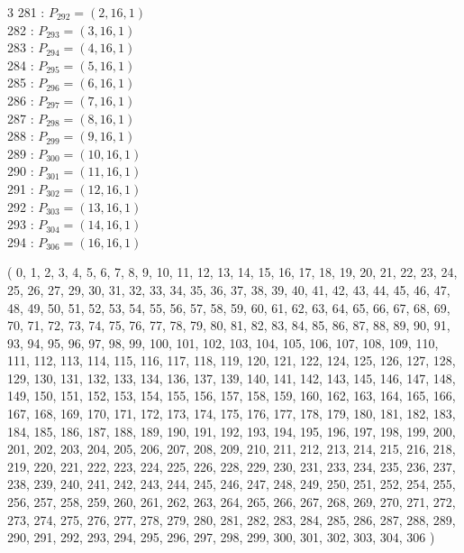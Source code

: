 \documentclass{article}
\begin{document}
{\begin{multicols}{3}
281 : $P_{292}=( 2, 16, 1 )$\\
282 : $P_{293}=( 3, 16, 1 )$\\
283 : $P_{294}=( 4, 16, 1 )$\\
284 : $P_{295}=( 5, 16, 1 )$\\
285 : $P_{296}=( 6, 16, 1 )$\\
286 : $P_{297}=( 7, 16, 1 )$\\
287 : $P_{298}=( 8, 16, 1 )$\\
288 : $P_{299}=( 9, 16, 1 )$\\
289 : $P_{300}=( 10, 16, 1 )$\\
290 : $P_{301}=( 11, 16, 1 )$\\
291 : $P_{302}=( 12, 16, 1 )$\\
292 : $P_{303}=( 13, 16, 1 )$\\
293 : $P_{304}=( 14, 16, 1 )$\\
294 : $P_{306}=( 16, 16, 1 )$\\
\end{multicols}
( 0, 1, 2, 3, 4, 5, 6, 7, 8, 9, 10, 11, 12, 13, 14, 15, 16, 17, 18, 19, 20, 21, 22, 23, 24, 25, 26, 27, 29, 30, 31, 32, 33, 34, 35, 36, 37, 38, 39, 40, 41, 42, 43, 44, 45, 46, 47, 48, 49, 50, 51, 52, 53, 54, 55, 56, 57, 58, 59, 60, 61, 62, 63, 64, 65, 66, 67, 68, 69, 70, 71, 72, 73, 74, 75, 76, 77, 78, 79, 80, 81, 82, 83, 84, 85, 86, 87, 88, 89, 90, 91, 93, 94, 95, 96, 97, 98, 99, 100, 101, 102, 103, 104, 105, 106, 107, 108, 109, 110, 111, 112, 113, 114, 115, 116, 117, 118, 119, 120, 121, 122, 124, 125, 126, 127, 128, 129, 130, 131, 132, 133, 134, 136, 137, 139, 140, 141, 142, 143, 145, 146, 147, 148, 149, 150, 151, 152, 153, 154, 155, 156, 157, 158, 159, 160, 162, 163, 164, 165, 166, 167, 168, 169, 170, 171, 172, 173, 174, 175, 176, 177, 178, 179, 180, 181, 182, 183, 184, 185, 186, 187, 188, 189, 190, 191, 192, 193, 194, 195, 196, 197, 198, 199, 200, 201, 202, 203, 204, 205, 206, 207, 208, 209, 210, 211, 212, 213, 214, 215, 216, 218, 219, 220, 221, 222, 223, 224, 225, 226, 228, 229, 230, 231, 233, 234, 235, 236, 237, 238, 239, 240, 241, 242, 243, 244, 245, 246, 247, 248, 249, 250, 251, 252, 254, 255, 256, 257, 258, 259, 260, 261, 262, 263, 264, 265, 266, 267, 268, 269, 270, 271, 272, 273, 274, 275, 276, 277, 278, 279, 280, 281, 282, 283, 284, 285, 286, 287, 288, 289, 290, 291, 292, 293, 294, 295, 296, 297, 298, 299, 300, 301, 302, 303, 304, 306 )\\
}
\end{document}

